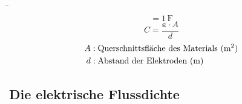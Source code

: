 \begin{frame}
\b{
	\begin{equation*}
		[C] = 1\,\text{F}
	\end{equation*}
	\vspace{0.1cm}
	\begin{equation*}
		C = \frac{\boldsymbol\varepsilon \cdot A}{d}
	\end{equation*}
	\begin{align*}
		A &: \text{Querschnittsfläche des Materials } (\text{m}{^2}) \\
		d &: \text{Abstand der Elektroden (\text{m})}
	\end{align*}

}
\end{frame}


\subsection{Die elektrische Flussdichte} %


